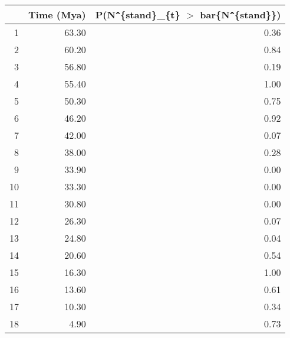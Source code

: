 \begin{table}[ht]
\centering
\begin{tabular}{rrr}
  \hline
 & Time (Mya) & P(N\verb|^|\{stand\}\_\{t\} $>$ bar\{N\verb|^|\{stand\}\}) \\ 
  \hline
1 & 63.30 & 0.36 \\ 
  2 & 60.20 & 0.84 \\ 
  3 & 56.80 & 0.19 \\ 
  4 & 55.40 & 1.00 \\ 
  5 & 50.30 & 0.75 \\ 
  6 & 46.20 & 0.92 \\ 
  7 & 42.00 & 0.07 \\ 
  8 & 38.00 & 0.28 \\ 
  9 & 33.90 & 0.00 \\ 
  10 & 33.30 & 0.00 \\ 
  11 & 30.80 & 0.00 \\ 
  12 & 26.30 & 0.07 \\ 
  13 & 24.80 & 0.04 \\ 
  14 & 20.60 & 0.54 \\ 
  15 & 16.30 & 1.00 \\ 
  16 & 13.60 & 0.61 \\ 
  17 & 10.30 & 0.34 \\ 
  18 & 4.90 & 0.73 \\ 
   \hline
\end{tabular}
\label{tab:div_peak}
\end{table}
